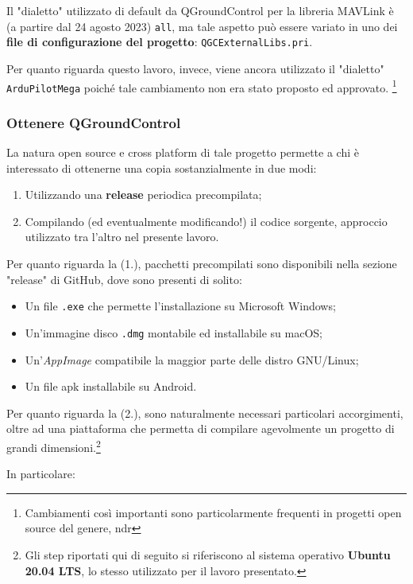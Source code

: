 \documentclass[a4paper, 12pt, oneside]{article}
\theoremstyle{definition}
\begin{document}
Il "dialetto" utilizzato di default da QGroundControl per la libreria MAVLink è (a partire dal 24 agosto 2023)\cite{qgc-all-commit} \texttt{all}, ma tale aspetto può essere variato in uno dei \textbf{file di configurazione del progetto}: \texttt{QGCExternalLibs.pri}.

Per quanto riguarda questo lavoro, invece, viene ancora utilizzato il "dialetto" \texttt{ArduPilotMega} poiché tale cambiamento non era stato proposto ed approvato. \footnote{Cambiamenti così importanti sono particolarmente frequenti in progetti open source del genere, ndr}

\subsubsection{Ottenere QGroundControl}
La natura open source e cross platform di tale progetto permette a chi è interessato di ottenerne una copia sostanzialmente in due modi:

\begin{enumerate}
    \item Utilizzando una \textbf{release} periodica precompilata;
    \item Compilando (ed eventualmente modificando!) il codice sorgente, approccio utilizzato tra l'altro nel presente lavoro.
\end{enumerate}

Per quanto riguarda la (1.), pacchetti precompilati sono disponibili nella sezione "release" di GitHub, dove sono presenti di solito:

\begin{itemize}
    \item Un file \texttt{.exe} che permette l'installazione su Microsoft Windows;
    \item Un'immagine disco \texttt{.dmg} montabile ed installabile su macOS;
    \item Un'\textit{AppImage} compatibile la maggior parte delle distro GNU/Linux;
    \item Un file apk installabile su Android.
\end{itemize}

Per quanto riguarda la (2.), sono naturalmente necessari particolari accorgimenti, oltre ad una piattaforma che permetta di compilare agevolmente un progetto di grandi dimensioni.\footnote{Gli step riportati qui di seguito si riferiscono al sistema operativo \textbf{Ubuntu 20.04 LTS}, lo stesso utilizzato per il lavoro presentato.}

In particolare:
\end{document}
